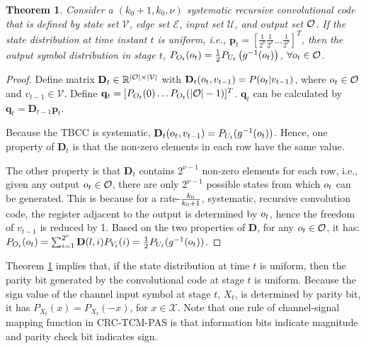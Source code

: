 \documentclass [PhD] {uclathes}
\newtheorem{theorem}{Theorem}
\begin{document}
\begin{theorem}\label{the: sym_dist}
Consider a $(k_0+1,k_0,\nu)$ systematic recursive  convolutional code that is defined by state set $\mathcal{V}$, edge set $\mathcal{E}$, input set $\mathcal{U}$, and output set $\mathcal{O}$. If the state distribution at time instant $t$ is uniform, i.e., $\mathbf{p}_t=\left[\frac{1}{2^\nu}\frac{1}{2^\nu}\dots \frac{1}{2^\nu}\right]^T$, then the output symbol distribution in stage $t$, $P_{O_t}(o_t)=\frac{1}{2} P_{U_t}\left(g^{-1}(o_t)\right)$, $\forall o_t\in\mathcal{O}$.
\end{theorem}

\begin{proof}
Define matrix $\mathbf{D}_t\in\mathbb{R}^{|\mathcal{O}|\times|\mathcal{V}|}$ with $\mathbf{D}_t(o_t,v_{t-1})=P(o_t|v_{t-1})$, where $o_t\in\mathcal{O}$ and $v_{t-1}\in\mathcal{V}$. Define $\mathbf{q}_{t}=[P_{O_t}(0) \dots P_{O_t}(|\mathcal{O}|-1)]^T$. $\mathbf{q}_{t}$ can be calculated by $\mathbf{q}_t=\mathbf{D}_{t-1}\mathbf{p}_t$.

Because the TBCC is systematic, $\mathbf{D}_t(o_t,v_{t-1})=P_{U_t}(g^{-1}(o_t))$.  Hence, one property of $\mathbf{D}_t$ is that the non-zero elements in each row have the same value.

The other property  is that $\mathbf{D}_t$ contains $2^{\nu-1}$ non-zero elements for each row, 
i.e., given any output $o_t\in\mathcal{O}$, there are only $2^{\nu-1}$ possible states from which $o_t$ can be generated. This is because for a rate-$\frac{k_0}{k_0+1}$, systematic, recursive convolution code, the register adjacent to the output is determined by $o_t$,  hence the freedom of $v_{t-1}$ is reduced by 1. Based on the two properties of $\mathbf{D}$, for any $o_t\in\mathcal{O}$,  it has: $P_{O_t}(o_t) = \sum_{i=1}^{2^\nu}\mathbf{D}(l,i)P_{V_t}(i)=\frac{1}{2}P_{U_t}(g^{-1}(o_t))$.
\end{proof}

Theorem \ref{the: sym_dist} implies that, if the state distribution at time $t$ is uniform, then the parity bit generated by the convolutional code at stage $t$ is uniform. Because the sign value of the channel input symbol at stage $t$, $X_t$, is determined by parity bit, it has $P_{X_t}(x)=P_{X_t}(-x)$, for $x\in\mathcal{X}$.
Note that one rule of channel-signal mapping function in CRC-TCM-PAS is that information bits indicate magnitude and parity check bit indicates sign.
\end{document}
